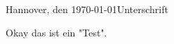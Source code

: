 \documentclass[
  twoside,
  paper=a4,
  fontsize=12pt,
  parskip=half-,
  headsepline,
  headinclude]{scrreprt}
\begin{document}
Hannover, den \today \hfill Unterschrift
\tableofcontents  %

\listoffigures      %

\listoftables       %

\blinddocument  %

Okay das ist ein "Test".


%
%
%
%
%
%
%
\end{document}
